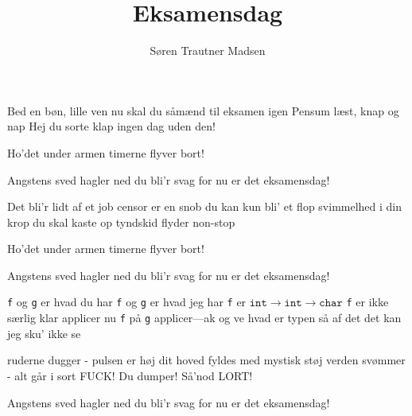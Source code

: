 \documentclass[12pt]{article}
\title{Eksamensdag}
\author{Søren Trautner Madsen}
\begin{document}
\twocolumn[
\maketitle
]
\begin{song}
Bed en bøn, lille ven
nu skal du såmænd
til eksamen igen
Pensum læst, knap og nap
Hej du sorte klap
ingen dag uden den!

Ho'det under armen
timerne flyver bort!

 Angstens sved
        hagler ned
        du bli'r svag
        for nu er det eksamensdag!

Det bli'r lidt af et job
censor er en snob
du kan kun bli' et flop
svimmelhed i din krop
du skal kaste op
tyndskid flyder non-stop

Ho'det under armen
timerne flyver bort!

 Angstens sved
        hagler ned
        du bli'r svag
        for nu er det eksamensdag!

\pagebreak[2]

\texttt{f} og \texttt{g} er hvad du har
\texttt{f} og \texttt{g} er hvad jeg har
\texttt{f} er
$\texttt{int}\rightarrow\texttt{int}\rightarrow\texttt{char}$
\texttt{f} er ikke særlig klar
applicer nu \texttt{f} på \texttt{g}
applicer---ak og ve
hvad er typen så af det
det kan jeg sku' ikke se

ruderne dugger - pulsen er høj
dit hoved fyldes med mystisk støj
verden svømmer - alt går i sort
FUCK! Du dumper! Så'nod LORT!

 Angstens sved
        hagler ned
        du bli'r svag
        for nu er det eksamensdag!
\end{song}
\end{document}
